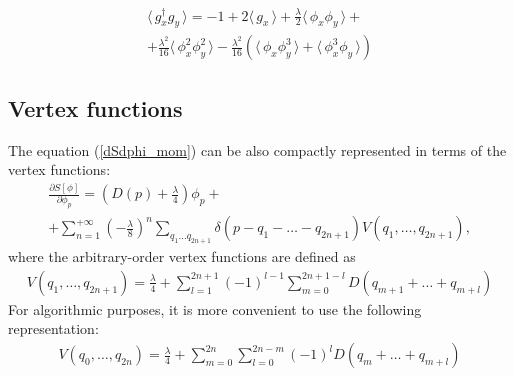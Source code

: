 \documentclass[12pt]{article}
\newcommand{\lr}[1]{ \left( #1 \right) }
\newcommand{\lrs}[1]{ \left[ #1 \right] }
\newcommand{\vev}[1]{ \langle \, #1 \, \rangle }
\begin{document}
\begin{eqnarray}
\label{gxgy_vev_lowest}
 \vev{g^{\dag}_x g_y} =
 -1 + 2 \vev{g_x} + \frac{\lambda}{2} \vev{\phi_x \phi_y}
 + \nonumber \\ +
   \frac{\lambda^2}{16} \vev{\phi_x^2 \phi_y^2}
 - \frac{\lambda^2}{16} \lr{\vev{\phi_x \phi_y^3} + \vev{\phi_x^3 \phi_y}}
\end{eqnarray}


\subsection{Vertex functions}
\label{subsec:vertex_func}

 The equation (\ref{dSdphi_mom}) can be also compactly represented in terms of the vertex functions:
\begin{eqnarray}
\label{dSdphi_mom_vertex}
 \frac{\partial S\lrs{\phi}}{\partial \phi_p}
 =
 \lr{D\lr{p} + \frac{\lambda}{4}} \phi_p
 + \nonumber \\ +
 \sum\limits_{n=1}^{+\infty} \lr{-\frac{\lambda}{8}}^{n}
 \sum\limits_{q_1 \ldots q_{2 n + 1}} \delta\lr{p - q_1 - \ldots - q_{2 n + 1}}
 V\lr{q_1, \ldots, q_{2 n + 1}} ,
\end{eqnarray}
where the arbitrary-order vertex functions are defined as
\begin{eqnarray}
\label{vertex_func_def}
 V\lr{q_1, \ldots, q_{2 n + 1}}
 =
 \frac{\lambda}{4} +
 \sum\limits_{l=1}^{2 n + 1} \lr{-1}^{l-1}
 \sum\limits_{m=0}^{2 n + 1 - l}
 D\lr{q_{m+1} + \ldots + q_{m+l}}
\end{eqnarray}
For algorithmic purposes, it is more convenient to use the following representation:
\begin{eqnarray}
\label{vertex_func_def_algorithmic}
 V\lr{q_0, \ldots, q_{2 n}}
 =
 \frac{\lambda}{4} +
 \sum\limits_{m=0}^{2 n}
 \sum\limits_{l=0}^{2 n - m}
 \lr{-1}^{l}
 D\lr{q_{m} + \ldots + q_{m+l}}
\end{eqnarray}
\end{document}

